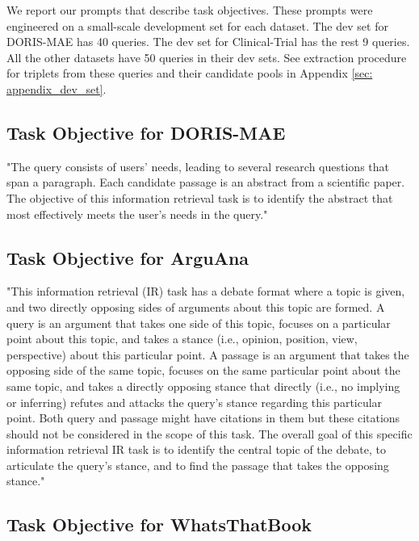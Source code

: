\documentclass[11pt]{article}
\begin{document}
We report our prompts that describe task objectives. These prompts were engineered on a small-scale development set for each dataset. The dev set for DORIS-MAE has 40 queries. The dev set for Clinical-Trial has the rest 9 queries. All the other datasets have 50 queries in their dev sets. See extraction procedure for triplets from these queries and their candidate pools in Appendix \ref{sec: appendix_dev_set}.

\subsection{Task Objective for DORIS-MAE}
\label{ssec: appendix_task objective for doris-mae}

"The query consists of users’ needs, leading to several research questions that span a paragraph. Each candidate passage is an abstract from a scientific paper. The objective of this information retrieval task is to identify the abstract that most effectively meets the user's needs in the query."


\subsection{Task Objective for ArguAna}
\label{ssec: appendix task objective for arguana}
"This information retrieval (IR) task has a debate format where a topic is given, and two directly opposing sides of arguments about this topic are formed.  A query is an argument that takes one side of this topic, focuses on a particular point about this topic, and takes a stance (i.e., opinion, position, view, perspective) about this particular point. A passage is an argument that takes the opposing side of the same topic, focuses on the same particular point about the same topic, and takes a directly opposing stance that directly (i.e., no implying or inferring) refutes and attacks the query’s stance regarding this particular point. Both query and passage might have citations in them but these citations should not be considered in the scope of this task. The overall goal of this specific information retrieval IR task is to identify the central topic of the debate, to articulate the query’s stance, and to find the passage that takes the opposing stance."




\subsection{Task Objective for WhatsThatBook}
\label{ssec: appendix_task objective for wtb}
\end{document}

